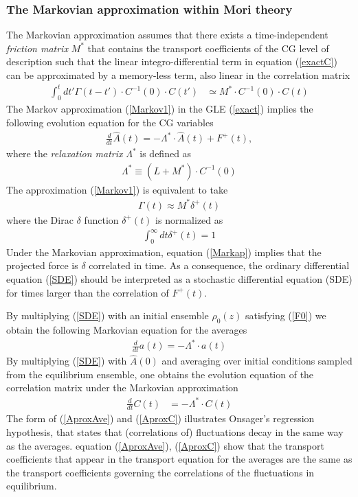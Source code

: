 \documentclass[b5paper,openright,10pt]{book}
\newcommand{\esc}{\!\cdot\!}
\begin{document}
\subsubsection{The Markovian approximation within Mori theory}
\label{Sec:Markov}
The   Markovian   approximation   assumes    that   there   exists   a
time-independent \textit{friction matrix} $M^*$ that
  contains the transport  coefficients of the CG  level of description
such that  the linear integro-differential term  in equation (\ref{exactC})
can  be  approximated  by  a  memory-less term,  also  linear  in  the
correlation matrix
\begin{align}
\int_0^tdt' \Gamma(t-t')\esc C^{-1}(0)\esc  C(t')&\simeq M^*\esc C^{-1}(0)\esc C(t)
\label{Markov1}
\end{align}
The  Markov approximation  (\ref{Markov1})  in  the GLE  (\ref{exact})
implies the following evolution equation for the CG variables
\begin{align}
  \frac{d}{dt}\hat{A}(t) = -\Lambda^*\esc \hat{A} (t) +F^+(t),
\label{SDE}
\end{align}
where the \textit{relaxation matrix} $\Lambda^*$ is defined as
\begin{align}
\Lambda^*\equiv(L+M^*)\esc C^{-1}(0)  
\label{Lambda}
\end{align}
The   approximation
(\ref{Markov1}) is equivalent to take
\begin{align}
  \Gamma(t) \approx M^*\delta^+(t)
\label{Markap}
\end{align}
where   the Dirac $\delta$ function
$\delta^+(t)$ is normalized as
\begin{align}
  \int_0^\infty dt \delta^+(t) =1
\end{align}
Under the  Markovian approximation,  equation  (\ref{Markap})  implies that
the projected  force is $\delta$ correlated  in time. As a  consequence, the
ordinary differential equation (\ref{SDE}) should be interpreted as a
stochastic  differential  equation (SDE)  for  times  larger than  the
correlation of $F^+(t)$.

By multiplying (\ref{SDE}) with an initial ensemble $\rho_0(z)$
satisfying (\ref{F0})
we obtain the following Markovian equation for the averages
\begin{align}
  \frac{d}{dt}a(t) = -\Lambda^*\esc a(t)
\label{AproxAve}
\end{align}
By  multiplying  (\ref{SDE})  with $\hat{A}(0)$  and  averaging  over
initial conditions sampled from  the equilibrium ensemble, one obtains
the evolution  equation of the  correlation matrix  under the
Markovian   approximation
\begin{align}
    \frac{d}{dt}C(t)&=-\Lambda^*\esc  C(t)
\label{AproxC}
\end{align}
The form of (\ref{AproxAve})  and (\ref{AproxC}) illustrates Onsager's
regression hypothesis, that states that (correlations of) fluctuations
decay  in  the  same  way  as  the  averages.   equation  (\ref{AproxAve}),
(\ref{AproxC}) show that the transport coefficients that appear in the
transport  equation for  the averages  are the  same as  the transport
coefficients  governing  the  correlations   of  the  fluctuations  in
equilibrium.
\end{document}
